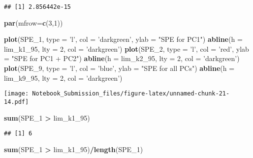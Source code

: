 \documentclass[
]{article}
\newenvironment{Shaded}{\begin{snugshade}}{\end{snugshade}}
\newcommand{\DataTypeTok}[1]{\textcolor[rgb]{0.13,0.29,0.53}{#1}}
\newcommand{\DecValTok}[1]{\textcolor[rgb]{0.00,0.00,0.81}{#1}}
\newcommand{\KeywordTok}[1]{\textcolor[rgb]{0.13,0.29,0.53}{\textbf{#1}}}
\newcommand{\NormalTok}[1]{#1}
\newcommand{\OperatorTok}[1]{\textcolor[rgb]{0.81,0.36,0.00}{\textbf{#1}}}
\newcommand{\StringTok}[1]{\textcolor[rgb]{0.31,0.60,0.02}{#1}}
\begin{document}
\begin{verbatim}
## [1] 2.856442e-15
\end{verbatim}

\begin{Shaded}
\begin{Highlighting}[]
\KeywordTok{par}\NormalTok{(}\DataTypeTok{mfrow=}\KeywordTok{c}\NormalTok{(}\DecValTok{3}\NormalTok{,}\DecValTok{1}\NormalTok{))}

\KeywordTok{plot}\NormalTok{(SPE_}\DecValTok{1}\NormalTok{, }\DataTypeTok{type =} \StringTok{'l'}\NormalTok{, }\DataTypeTok{col =} \StringTok{'darkgreen'}\NormalTok{, }\DataTypeTok{ylab =} \StringTok{"SPE for PC1"}\NormalTok{)}
\KeywordTok{abline}\NormalTok{(}\DataTypeTok{h =}\NormalTok{ lim_k1_}\DecValTok{95}\NormalTok{, }\DataTypeTok{lty =} \DecValTok{2}\NormalTok{, }\DataTypeTok{col =} \StringTok{'darkgreen'}\NormalTok{)}
\KeywordTok{plot}\NormalTok{(SPE_}\DecValTok{2}\NormalTok{, }\DataTypeTok{type =} \StringTok{'l'}\NormalTok{, }\DataTypeTok{col =} \StringTok{'red'}\NormalTok{, }\DataTypeTok{ylab =} \StringTok{"SPE for PC1 + PC2"}\NormalTok{)}
\KeywordTok{abline}\NormalTok{(}\DataTypeTok{h =}\NormalTok{ lim_k2_}\DecValTok{95}\NormalTok{, }\DataTypeTok{lty =} \DecValTok{2}\NormalTok{, }\DataTypeTok{col =} \StringTok{'darkgreen'}\NormalTok{)}
\KeywordTok{plot}\NormalTok{(SPE_}\DecValTok{9}\NormalTok{, }\DataTypeTok{type =} \StringTok{'l'}\NormalTok{, }\DataTypeTok{col =} \StringTok{'blue'}\NormalTok{, }\DataTypeTok{ylab =} \StringTok{"SPE for all PCs"}\NormalTok{)}
\KeywordTok{abline}\NormalTok{(}\DataTypeTok{h =}\NormalTok{ lim_k9_}\DecValTok{95}\NormalTok{, }\DataTypeTok{lty =} \DecValTok{2}\NormalTok{, }\DataTypeTok{col =} \StringTok{'darkgreen'}\NormalTok{)}
\end{Highlighting}
\end{Shaded}

\texttt{[image: Notebook\_Submission\_files/figure-latex/unnamed-chunk-21-14.pdf]}

\begin{Shaded}
\begin{Highlighting}[]
\KeywordTok{sum}\NormalTok{(SPE_}\DecValTok{1} \OperatorTok{>}\StringTok{ }\NormalTok{lim_k1_}\DecValTok{95}\NormalTok{)}
\end{Highlighting}
\end{Shaded}

\begin{verbatim}
## [1] 6
\end{verbatim}

\begin{Shaded}
\begin{Highlighting}[]
\KeywordTok{sum}\NormalTok{(SPE_}\DecValTok{1} \OperatorTok{>}\StringTok{ }\NormalTok{lim_k1_}\DecValTok{95}\NormalTok{)}\OperatorTok{/}\KeywordTok{length}\NormalTok{(SPE_}\DecValTok{1}\NormalTok{)}
\end{Highlighting}
\end{Shaded}
\end{document}
